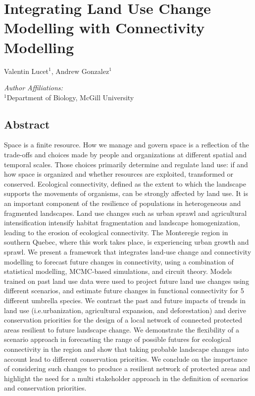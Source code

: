 \chapter{Integrating Land Use Change Modelling with Connectivity Modelling}
\begin{center}
{Valentin Lucet$^{1}$, Andrew Gonzalez$^{1}$}\\
\end{center}
\textit{Author Affiliations:}\\
\normalsize{$^{1}$Department of Biology, McGill University}\\
\section{Abstract}

Space is a finite resource. How we manage and govern space is a reflection of the trade-offs and choices made by people and organizations at different spatial and temporal scales. Those choices primarily determine and regulate land use: if and how space is organized and whether resources are exploited, transformed or conserved. Ecological connectivity, defined as the extent to which the landscape supports the movements of organisms, can be strongly affected by land use. It is an important component of the resilience of populations in heterogeneous and fragmented landscapes. Land use changes such as urban sprawl and agricultural intensification intensify habitat fragmentation and landscape homogenization, leading to the erosion of ecological connectivity. The Monteregie region in southern Quebec, where this work takes place, is experiencing urban growth and sprawl. We present a framework that integrates land-use change and connectivity modelling to forecast future changes in connectivity, using a combination of statistical modelling, MCMC-based simulations, and circuit theory. Models trained on past land use data were used to project future land use changes using different scenarios, and estimate future changes in functional connectivity for 5 different umbrella species. We contrast the past and future impacts of trends in land use (i.e.urbanization, agricultural expansion, and deforestation) and derive conservation priorities for the design of a local network of connected protected areas resilient to future landscape change. We demonstrate the flexibility of a scenario approach in forecasting the range of possible futures for ecological connectivity in the region and show that taking probable landscape changes into account lead to different conservation priorities. We conclude on the importance of considering such changes to produce a resilient network of protected areas and highlight the need for a multi stakeholder approach in the definition of scenarios and conservation priorities.\\

